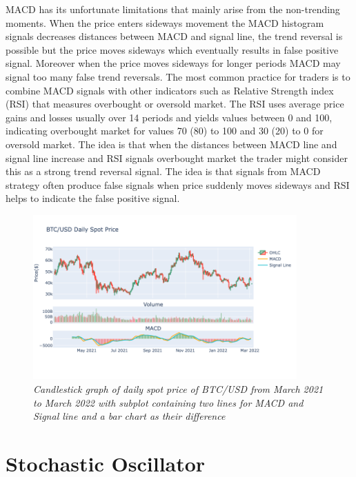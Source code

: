 MACD has its unfortunate limitations that mainly arise from the non-trending moments. When the price enters sideways movement the MACD histogram signals decreases distances between MACD and signal line, the trend reversal is possible but the price moves sideways which eventually results in false positive signal. Moreover when the price moves sideways for longer periods MACD may signal too many false trend reversals. The most common practice for traders is to combine MACD signals with other indicators such as Relative Strength index (RSI) that measures overbought or oversold market. The RSI uses average price gains and losses usually over 14 periods and yields values between 0 and 100, indicating overbought market for values 70 (80) to 100 and 30 (20) to 0 for oversold market. The idea is that when the distances between MACD line and signal line increase and RSI signals overbought market the trader might consider this as a strong trend reversal signal. The idea is that signals from MACD strategy often produce false signals when price suddenly moves sideways and RSI helps to indicate the false positive signal. 

\begin{figure}[ht]

\begin{center}
	\includegraphics[width=0.9\textwidth]{Figs/MACD.png}
\end{center}

\caption{\textit{ Candlestick graph of daily spot price of BTC/USD from March 2021 to March 2022 with subplot containing two lines for MACD and Signal line and a bar chart as their difference}}

\end{figure}

\section{Stochastic Oscillator}


